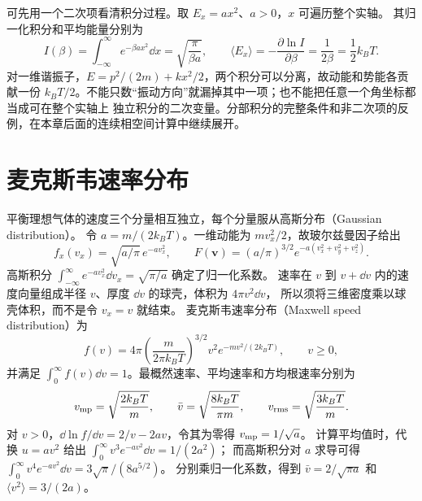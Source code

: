 可先用一个二次项看清积分过程。取 $E_x=ax^2$、$a>0$，$x$ 可遍历整个实轴。
其归一化积分和平均能量分别为
\[
 I(\beta)=\int_{-\infty}^{\infty}e^{-\beta ax^2}\dd x
 =\sqrt{\frac{\pi}{\beta a}},\qquad
 \langle E_x\rangle=-\frac{\partial\ln I}{\partial\beta}
 =\frac1{2\beta}=\frac12k_BT.
\]
对一维谐振子，$E=p^2/(2m)+kx^2/2$，两个积分可以分离，故动能和势能各贡献一份
$k_BT/2$。不能只数“振动方向”就漏掉其中一项；也不能把任意一个角坐标都当成可在整个实轴上
独立积分的二次变量。分部积分的完整条件和非二次项的反例，在本章后面的连续相空间计算中继续展开。

\section{麦克斯韦速率分布}

平衡理想气体的速度三个分量相互独立，每个分量服从高斯分布（Gaussian distribution）。
令 $a=m/(2k_BT)$。一维动能为 $mv_x^2/2$，故玻尔兹曼因子给出
\[f_x(v_x)=\sqrt{a/\pi}\,e^{-av_x^2},\qquad
F(\boldsymbol v)=(a/\pi)^{3/2}e^{-a(v_x^2+v_y^2+v_z^2)}.\]
高斯积分 $\int_{-\infty}^{\infty}e^{-av_x^2}\dd v_x=\sqrt{\pi/a}$ 确定了归一化系数。
速率在 $v$ 到 $v+\dd v$ 内的速度向量组成半径 $v$、厚度 $\dd v$ 的球壳，体积为 $4\pi v^2\dd v$，
所以须将三维密度乘以球壳体积，而不是令 $v_x=v$ 就结束。
麦克斯韦速率分布（Maxwell speed distribution）为
\begin{equation}
 f(v)=4\pi\left(\frac{m}{2\pi k_BT}\right)^{3/2}
 v^2e^{-mv^2/(2k_BT)},\qquad v\ge0,
\end{equation}
并满足 $\int_0^\infty f(v)\dd v=1$。最概然速率、平均速率和方均根速率分别为
\begin{equation}
 v_{\rm mp}=\sqrt{\frac{2k_BT}{m}},\qquad
 \bar v=\sqrt{\frac{8k_BT}{\pi m}},\qquad
 v_{\rm rms}=\sqrt{\frac{3k_BT}{m}}.
\end{equation}
对 $v>0$，$\dd\ln f/\dd v=2/v-2av$，令其为零得 $v_{\rm mp}=1/\sqrt a$。
计算平均值时，代换 $u=av^2$ 给出 $\int_0^\infty v^3e^{-av^2}\dd v=1/(2a^2)$；
而高斯积分对 $a$ 求导可得 $\int_0^\infty v^4e^{-av^2}\dd v=3\sqrt\pi/(8a^{5/2})$。
分别乘归一化系数，得到 $\bar v=2/\sqrt{\pi a}$ 和 $\langle v^2\rangle=3/(2a)$。

